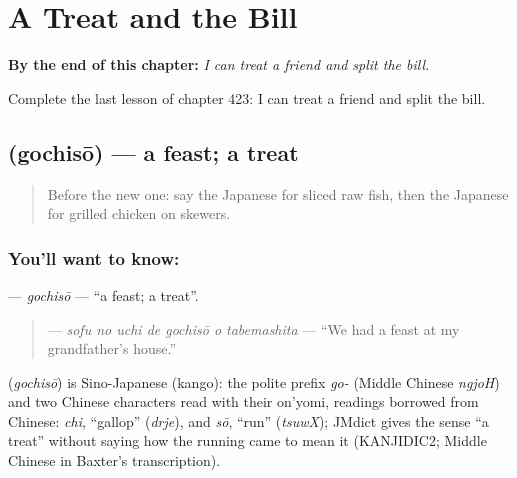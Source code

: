 
\chapter{A Treat and the Bill}
\label{ch:ja-a-treat-and-the-bill}

\begin{chapteropening}
\textbf{By the end of this chapter:} \emph{I can treat a friend and split the bill.}

Complete the last lesson of chapter 423: I can treat a friend and split the bill.
\end{chapteropening}

\section[\texorpdfstring{\ja{ごちそう} (gochisō)}{ごちそう (gochisō)}]{ (gochisō) — a feast; a treat}

\label{lesson:JA-C423-gochisou}



\begin{quote}
Before the new one: say the Japanese for sliced raw fish, then the Japanese for grilled chicken on skewers.
\end{quote}

\subsection*{You'll want to know: }
\textbf{} — \emph{gochisō} — \textquotedblleft{}a feast; a treat\textquotedblright{}.

\begin{quote}
\textbf{   } — \emph{sofu no uchi de gochisō o tabemashita} — \textquotedblleft{}We had a feast at my grandfather's house.\textquotedblright{}
\end{quote}

\begin{cousinweb}
\textbf{} (\emph{gochisō}) is Sino-Japanese (kango): the polite prefix \emph{go-} (Middle Chinese \emph{ngjoH}) and two Chinese characters read with their on'yomi, readings borrowed from Chinese: \emph{chi}, \textquotedblleft{}gallop\textquotedblright{} (\emph{drje}), and \emph{sō}, \textquotedblleft{}run\textquotedblright{} (\emph{tsuwX}); JMdict gives the sense \textquotedblleft{}a treat\textquotedblright{} without saying how the running came to mean it (KANJIDIC2; Middle Chinese in Baxter's transcription).
\end{cousinweb}

